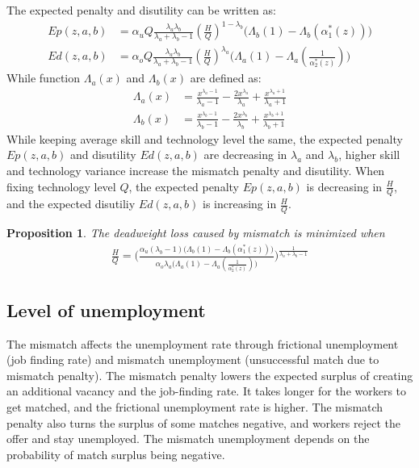 \documentclass[12pt]{article}
\newtheorem{proposition}{Proposition}
\newcommand{\1}{\mathbb{1}}
\begin{document}
The expected penalty and disutility can be written as: 
\begin{align*}
Ep(z,a,b) &= \alpha_uQ \frac{\lambda_a\lambda_b}{\lambda_a+\lambda_b-1}(\frac{H}{Q})^{1-\lambda_b}\Big(\Lambda_b(1)-\Lambda_b(\alpha_1^*(z))\Big) \\
Ed(z,a,b) &= \alpha_oQ \frac{\lambda_a\lambda_b}{\lambda_a+\lambda_b-1}(\frac{H}{Q})^{\lambda_a}\Big(\Lambda_a(1)-\Lambda_a(\frac{1}{\alpha_2^*(z)})\Big) 
\end{align*}
While function $\Lambda_a(x)$ and $\Lambda_b(x)$ are defined as: 
\begin{align*}
\Lambda_a(x) &= \frac{x^{\lambda_a-1}}{\lambda_a-1}- \frac{2x^{\lambda_a}}{\lambda_a}+ \frac{x^{\lambda_a+1}}{\lambda_a+1}\\
\Lambda_b(x) &= \frac{x^{\lambda_b-1}}{\lambda_b-1}- \frac{2x^{\lambda_b}}{\lambda_b}+ \frac{x^{\lambda_b+1}}{\lambda_b+1}
\end{align*}
While keeping average skill and technology level the same, the expected penalty $Ep(z,a,b)$ and disutility $Ed(z,a,b)$ are decreasing in $\lambda_a$ and $\lambda_b$, higher skill and technology variance increase the mismatch penalty and disutility. When fixing technology level $Q$, the expected penalty $Ep(z,a,b)$ is decreasing in $\frac{H}{Q}$, and the expected disutiliy $Ed(z,a,b)$ is increasing in $\frac{H}{Q}$. 
\begin{proposition}
The deadweight loss caused by mismatch is minimized when 
\begin{align*}
\frac{H}{Q} = \Bigg(\frac{\alpha_u(\lambda_b-1)\Big(\Lambda_b(1)-\Lambda_b(\alpha_1^*(z))\Big)}{\alpha_o\lambda_a\Big(\Lambda_a(1)-\Lambda_a(\frac{1}{\alpha_2^*(z)})\Big)}\Bigg)^{\frac{1}{\lambda_a+\lambda_b-1}}
\end{align*}
\end{proposition}


\subsection{Level of unemployment}
The mismatch affects the unemployment rate through frictional unemployment (job finding rate) and mismatch unemployment (unsuccessful match due to mismatch penalty). The mismatch penalty lowers the expected surplus of creating an additional vacancy and the job-finding rate. It takes longer for the workers to get matched, and the frictional unemployment rate is higher. The mismatch penalty also turns the surplus of some matches negative, and workers reject the offer and stay unemployed. The mismatch unemployment depends on the probability of match surplus being negative. \\
\end{document}
